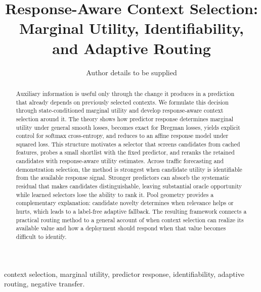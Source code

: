 \documentclass[journal,10pt]{IEEEtran}
\theoremstyle{definition}
\begin{document}
\title{Response-Aware Context Selection: Marginal Utility, Identifiability, and Adaptive Routing}
\author{Author details to be supplied}
\maketitle
\begin{abstract}
Auxiliary information is useful only through the change it produces in a prediction that already depends on previously selected contexts. We formulate this decision through state-conditioned marginal utility and develop response-aware context selection around it. The theory shows how predictor response determines marginal utility under general smooth losses, becomes exact for Bregman losses, yields explicit control for softmax cross-entropy, and reduces to an affine response model under squared loss. This structure motivates a selector that screens candidates from cached features, probes a small shortlist with the fixed predictor, and reranks the retained candidates with response-aware utility estimates. Across traffic forecasting and demonstration selection, the method is strongest when candidate utility is identifiable from the available response signal. Stronger predictors can absorb the systematic residual that makes candidates distinguishable, leaving substantial oracle opportunity while learned selectors lose the ability to rank it. Pool geometry provides a complementary explanation: candidate novelty determines when relevance helps or hurts, which leads to a label-free adaptive fallback. The resulting framework connects a practical routing method to a general account of when context selection can realize its available value and how a deployment should respond when that value becomes difficult to identify.
\end{abstract}
\begin{IEEEkeywords}
context selection, marginal utility, predictor response, identifiability,
adaptive routing, negative transfer.
\end{IEEEkeywords}












\end{document}
